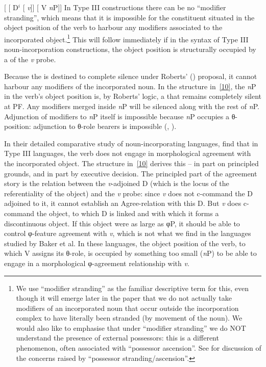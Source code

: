 \documentclass[output=paper]{langsci/langscibook}
\begin{document}
\begin{refcontext}
\ea {}[ [ D$^i$ [ \hspace{-.4em}\emph{v}\tss{\{[+V], \Acc{}, \ldots{}\}}]] [ V \emph{n}P\tss{\{[+N]\}}]] \label{10}
\z
In Type III constructions there can be no \enquote{modifier stranding}, which means
that it is impossible for the constituent situated in the object position of
the verb to harbour any modifiers associated to the incorporated
object.\footnote{We use \enquote{modifier stranding} as the familiar descriptive
    term for this, even though it will emerge later in the paper that we do not
    actually take modifiers of an incorporated noun that occur outside the
    incorporation complex to have literally been stranded (by movement of the
    noun). We would also like to emphasise that under \enquote{modifier stranding}
    we do NOT understand the presence of external possessors: this is a
different phenomenon, often associated with \enquote{possessor ascension}. See
\citet[168]{bakeretal05} for discussion of the concerns raised by \enquote{possessor
stranding/ascension}.} This will follow immediately if in the syntax of Type
III noun-incorporation constructions, the object position is structurally
occupied by a  of the \emph{v} probe.

Because the  is destined to complete silence under  Roberts'
(\citeyear{Roberts2010}) proposal, it cannot harbour any modifiers of the
incorporated noun. In the structure in~\eqref{10}, the \emph{n}P in the verb's
object position is, by Roberts' logic, a  that remains completely
silent at PF. Any modifiers merged inside \emph{n}P will be silenced along with
the rest of \emph{n}P. Adjunction of modifiers to \emph{n}P itself is
impossible because \emph{n}P occupies a θ{}-position: adjunction to
θ{}-role bearers is impossible (\citealt[6]{Chomsky1986},
\citealt[57]{mccloskey96}).

In their detailed comparative study of noun-incorporating languages,
\cite{bakeretal05} find that in Type III languages, the verb does not engage in
morphological agreement with the incorporated object. The structure in~\eqref{10}
derives this -- in part on principled grounds, and in part by executive
decision. The principled part of the agreement story is the relation between
the \emph{v}-adjoined D (which is the locus of the referentiality of the
object) and the \emph{v} probe: since \emph{v} does not c-command the D
adjoined to it, it cannot establish an Agree-relation with this D. But \emph{v}
does c-command the object, to which D is linked and with which it forms a
discontinuous object. If this object were as large as φ{}P, it should be
able to control φ{}-feature agreement with \emph{v}, which is not what
we find in the languages studied by Baker et al. In these languages, the object
position of the verb, to which V assigns its θ{}-role, is occupied by
something too small (\emph{n}P) to be able to engage in a morphological
φ{}-agreement relationship with \emph{v}.


\end{refcontext}
\end{document}
